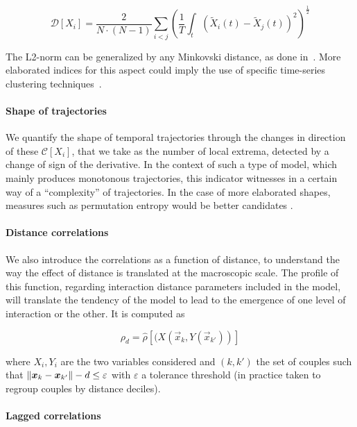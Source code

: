 \begin{equation}
\mathcal{D}\left[X_i\right] = \frac{2}{N\cdot(N-1)}\sum_{i<j} \left(\frac{1}{T}\int_{t} \left(\tilde{X}_i(t) - \tilde{X}_j(t)\right)^2 \right)^{\frac{1}{2}}
\end{equation}

The L2-norm can be generalized by any Minkovski distance, as done in~\cite{raimbault2016hybrid}. More elaborated indices for this aspect could imply the use of specific time-series clustering techniques~\cite{liao2005clustering}.


\paragraph{Shape of trajectories}

We quantify the shape of temporal trajectories through the changes in direction of these $\mathcal{C}\left[X_i\right]$, that we take as the number of local extrema, detected by a change of sign of the derivative. In the context of such a type of model, which mainly produces monotonous trajectories, this indicator witnesses in a certain way of a ``complexity'' of trajectories. In the case of more elaborated shapes, measures such as permutation entropy would be better candidates \cite{scarpino2017predictability}.
	
	
\paragraph{Distance correlations}

We also introduce the correlations as a function of distance, to understand the way the effect of distance is translated at the macroscopic scale. The profile of this function, regarding interaction distance parameters included in the model, will translate the tendency of the model to lead to the emergence of one level of interaction or the other. It is computed as

\begin{equation}
\rho_d = \hat{\rho}\left[(X(\vec{x}_k,Y(\vec{x}_{k'}))\right]
\end{equation}

where $X_i, Y_i$ are the two variables considered and $(k,k')$ the set of couples such that $\norm{\vec{x}_k-\vec{x}_{k'}} - d \leq \varepsilon$ with $\varepsilon$ a tolerance threshold (in practice taken to regroup couples by distance deciles).


\paragraph{Lagged correlations}

